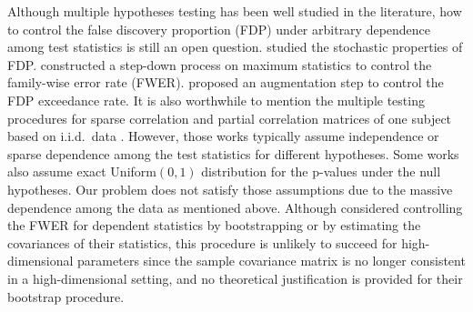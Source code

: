 \documentclass[12pt]{article}
\theoremstyle{definition}
\begin{document}
Although multiple hypotheses testing has been well studied in the literature, how to control the false discovery proportion (FDP) under arbitrary dependence among test statistics is still an open question.
\cite{genovese2004stochastic} studied the stochastic properties of FDP.
\cite{van2004multipleA} constructed a step-down process on maximum statistics to control the family-wise error rate (FWER). \cite{van2004multiple, GW_2006} proposed an augmentation step to control the FDP exceedance rate. 
It is also worthwhile to mention the multiple testing procedures for sparse correlation and partial correlation matrices of one subject based on i.i.d.\ data \citep{Cai_Liu, qiu2020estimating}. 
However, those works typically assume independence or sparse dependence among the test statistics for different hypotheses. Some works also assume exact Uniform$(0, 1)$ distribution for the p-values under the null hypotheses. 
Our problem does not satisfy those assumptions due to the massive dependence among the data as mentioned above. 
Although \cite{van2004multipleA} considered controlling the FWER for dependent statistics by bootstrapping or by estimating the covariances of their statistics,
this procedure is unlikely to succeed for high-dimensional parameters since the sample covariance matrix is no longer consistent in a high-dimensional setting, and no theoretical justification is provided for their bootstrap procedure.
\end{document}
